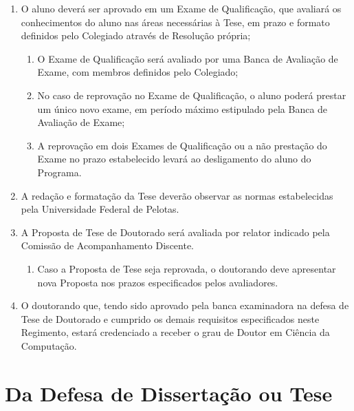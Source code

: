 \documentclass{article}
\begin{document}
\begin{enumerate}
	\item  O aluno deverá ser aprovado em um Exame de Qualificação, que avaliará os conhecimentos do aluno nas áreas necessárias à Tese, em prazo e formato definidos pelo Colegiado através de Resolução própria;
	\begin{enumerate}
		\item O Exame de Qualificação será avaliado por uma Banca de Avaliação de Exame, com membros definidos pelo Colegiado;
		\item No caso de reprovação no Exame de Qualificação, o aluno poderá prestar um único novo exame, em período máximo estipulado pela Banca de Avaliação de Exame;
		\item A reprovação em dois Exames de Qualificação ou a não prestação do Exame no prazo estabelecido levará ao desligamento do aluno do Programa.
	\end{enumerate}

	\item  A redação e formatação da Tese deverão observar as normas estabelecidas pela Universidade Federal de Pelotas.
	\item  A Proposta de Tese de Doutorado será avaliada por relator indicado pela Comissão de Acompanhamento Discente.
	\begin{enumerate}
		\item Caso a Proposta de Tese seja reprovada, o doutorando deve apresentar nova Proposta nos prazos especificados pelos avaliadores.
	\end{enumerate}
	\item  O doutorando que, tendo sido aprovado pela banca examinadora na defesa de Tese de Doutorado e cumprido os demais requisitos especificados neste Regimento, estará credenciado a receber o grau de Doutor em Ciência da Computação.
\end{enumerate}

\section{Da Defesa de Dissertação ou Tese}
\end{document}
